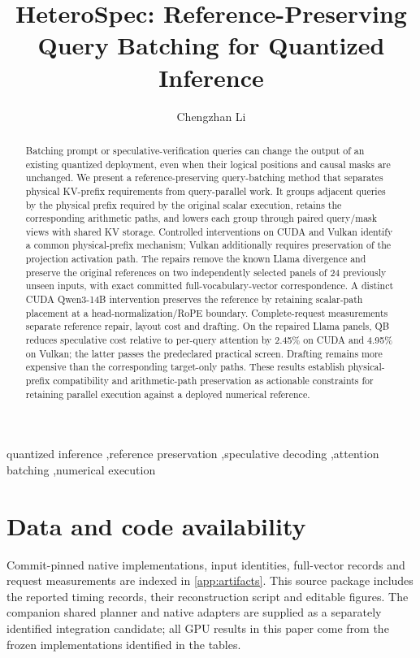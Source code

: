 \documentclass[final,5p,times,twocolumn]{elsarticle}
\begin{document}
\begin{frontmatter}
\title{HeteroSpec: Reference-Preserving Query Batching for Quantized Inference}
\author{Chengzhan Li}
\address{University of Electronic Science and Technology of China, Chengdu, China\\[2pt]
{\normalfont\ttfamily\href{mailto:chengzhan.li@std.uestc.edu.cn}{chengzhan.li@std.uestc.edu.cn}}}
\begin{abstract}
Batching prompt or speculative-verification queries can change the output of an existing quantized deployment, even when their logical positions and causal masks are unchanged. We present a reference-preserving query-batching method that separates physical KV-prefix requirements from query-parallel work. It groups adjacent queries by the physical prefix required by the original scalar execution, retains the corresponding arithmetic paths, and lowers each group through paired query/mask views with shared KV storage. Controlled interventions on CUDA and Vulkan identify a common physical-prefix mechanism; Vulkan additionally requires preservation of the projection activation path. The repairs remove the known Llama divergence and preserve the original references on two independently selected panels of 24 previously unseen inputs, with exact committed full-vocabulary-vector correspondence. A distinct CUDA Qwen3-14B intervention preserves the reference by retaining scalar-path placement at a head-normalization/RoPE boundary. Complete-request measurements separate reference repair, layout cost and drafting. On the repaired Llama panels, QB reduces speculative cost relative to per-query attention by 2.45\% on CUDA and 4.95\% on Vulkan; the latter passes the predeclared practical screen. Drafting remains more expensive than the corresponding target-only paths. These results establish physical-prefix compatibility and arithmetic-path preservation as actionable constraints for retaining parallel execution against a deployed numerical reference.
\end{abstract}
\begin{keyword}
quantized inference \sep reference preservation \sep speculative decoding \sep attention batching \sep numerical execution
\end{keyword}
\end{frontmatter}







\section*{Data and code availability}
Commit-pinned native implementations, input identities, full-vector records and request measurements are indexed in \ref{app:artifacts}. This source package includes the reported timing records, their reconstruction script and editable figures. The companion shared planner and native adapters are supplied as a separately identified integration candidate; all GPU results in this paper come from the frozen implementations identified in the tables.
\end{document}
